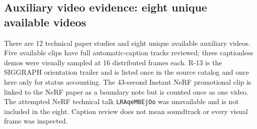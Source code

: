 \subsection{Auxiliary video evidence: eight unique available videos}\label{04-visual-computing-ii-ch036-auxiliary-video-evidence-eight-unique-available-videos}

\hypertarget{04-visual-computing-ii-ch036-auxiliary-video-evidence-eight-unique-available-videos}{}

There are 12 technical paper studies and eight unique available auxiliary videos. Five available clips have full automatic-caption tracks reviewed; three captionless demos were visually sampled at 16 distributed frames each. R-13 is the SIGGRAPH orientation trailer and is listed once in the source catalog and once here only for status accounting. The 43-second Instant NeRF promotional clip is linked to the NeRF paper as a boundary note but is counted once as one video. The attempted NeRF technical talk \texttt{LRAqeM8EjOo} was unavailable and is not included in the eight. Caption review does not mean soundtrack or every visual frame was inspected.

